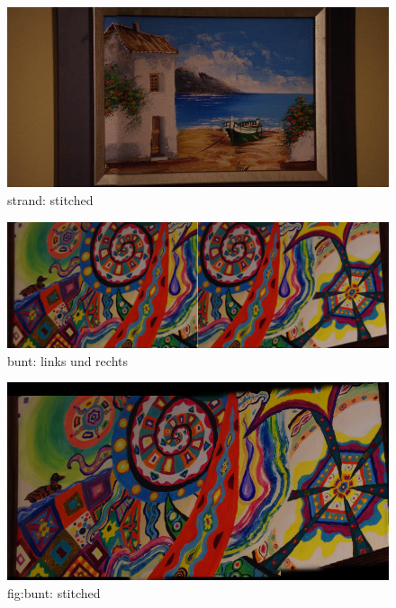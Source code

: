 \documentclass[deutsch]{scrartcl}
\begin{document}
\begin{figure}
\begin{center}
\includegraphics[width=1.0\textwidth]{strandS.png}
\caption{strand: stitched}
\label{fig:strandS}
\end{center}
\end{figure}

\begin{figure}
\begin{center}
\includegraphics[width=1.0\textwidth]{bunt.jpg}
\caption{bunt: links und rechts}
\label{fig:bunt}
\end{center}
\end{figure}

\begin{figure}
\begin{center}
\includegraphics[width=1.0\textwidth]{buntS.png}
\caption{fig:bunt: stitched}
\label{buntS}
\end{center}
\end{figure}
\end{document}
